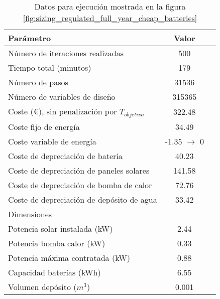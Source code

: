 \begin{table}[ht]
	\centering
	\caption{Datos para ejecución mostrada en la figura \ref{fig:sizing_regulated_full_year_cheap_batteries}}
	\label{tab:sizing_regulated_full_year_cheap_batteries}
	\begin{tabular}{@{}lcc@{}}
		\toprule
		Parámetro                                      & Valor                 \\
		\midrule
		Número de iteraciones realizadas               & 500                   \\
		Tiempo total (minutos)                         & 179                   \\
		Número de pasos                                & 31536                 \\
		Número de variables de diseño                  & 315365                \\
		\midrule
		Coste (€), sin penalización por $T_{objetivo}$ & 322.48                \\
		\midrule
		Coste fijo de energía                          & 34.49                 \\
		Coste variable de energía                      & -1.35 $\rightarrow$ 0 \\
		Coste de depreciación de batería               & 40.23                 \\
		Coste de depreciación de paneles solares       & 141.58                \\
		Coste de depreciación de bomba de calor        & 72.76                 \\
		Coste de depreciación de depósito de agua      & 33.42                 \\
		\midrule
		Dimensiones                                    &                       \\
		\midrule
		Potencia solar instalada (kW)                  & 2.44                  \\
		Potencia bomba calor (kW)                      & 0.33                  \\
		Potencia máxima contratada (kW)                & 0.88                  \\
		Capacidad baterías (kWh)                       & 6.55                  \\
		Volumen depósito ($m^3$)                       & 0.001                 \\
		\bottomrule
	\end{tabular}
\end{table}


